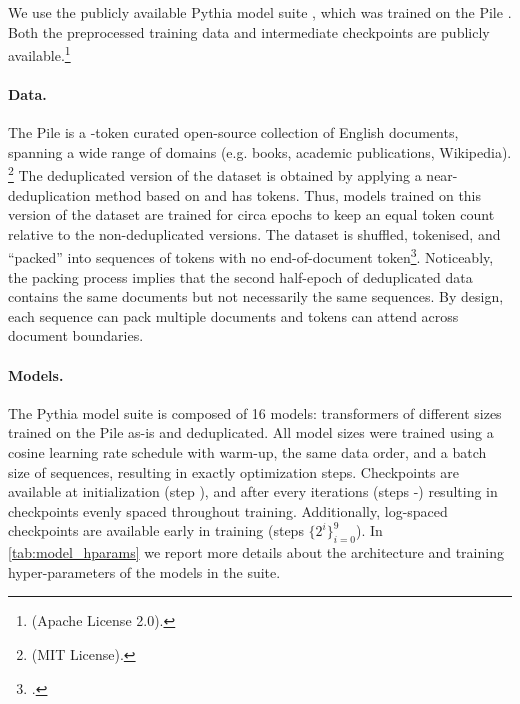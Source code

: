 \begin{table}[!t]
    \centering
    
    \caption{Matthew's Correlation Coefficient %
    between binary variables indicating whether a given layer converges early in training and whether it maintains a stable PER of the parameters ($\vtheta$) and gradients ($\nabla\vtheta$) throughout training for both $\attention$ and $\mlp$.}
    \label{tab:model_correlation}
\end{table}


%
%
%

We use the publicly available Pythia model suite \citep{biderman2023pythia}, which was trained on the Pile \citep{gao2020pile}. Both the preprocessed training data and intermediate checkpoints are publicly available.\footnote{\href{https://github.com/EleutherAI/pythia}{} (Apache License 2.0).} 

\paragraph{Data.}
The Pile is a -token curated open-source collection of English documents, spanning a wide range of domains (e.g. books, academic publications, Wikipedia). \footnote{\href{https://github.com/EleutherAI/the-pile}{} (MIT License).}  
The deduplicated version of the dataset is obtained by applying a near-deduplication method based on  and has  tokens.
Thus, models trained on this version of the dataset are trained for circa  epochs to keep an equal token count relative to the non-deduplicated versions.
The dataset is shuffled, tokenised, and \enquote{packed} into sequences of  tokens with no end-of-document token\footnote{\href{https://github.com/EleutherAI/pythia/issues/123}{}.}.
Noticeably, the packing process implies that the second half-epoch of deduplicated data contains the same documents but not necessarily the same sequences. 
By design, each sequence can pack multiple documents and tokens can attend across document boundaries.

\paragraph{Models.}
The Pythia model suite is composed of 16 models: transformers of  different sizes trained on the Pile as-is and deduplicated.
All model sizes were trained using a cosine learning rate schedule with warm-up, the same data order, and a batch size of  sequences, resulting in exactly  optimization steps.
Checkpoints are available at initialization (step ), and after every  iterations (steps -) resulting in  checkpoints evenly spaced throughout training. 
Additionally, log-spaced checkpoints are available early in training (steps $\{2^i\}_{i=0}^{9}$). In \cref{tab:model_hparams} we report more details about the architecture and training hyper-parameters of the models in the suite.

